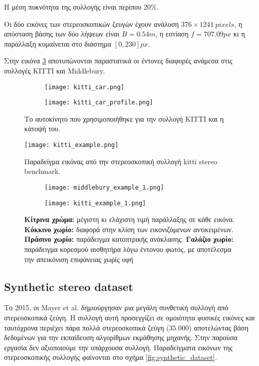 Η μέση πυκνότητα της συλλογής είναι περίπου $20\%$.

Οι δύο εικόνες των στερεοσκοπικών ζευγών έχουν ανάλυση $376\times1241 \: pixels$, η απόσταση βάσης των δύο λήψεων είναι $B=0.54m$, η εστίαση $f=707.09 px$ κι η παράλλαξη κυμαίνεται στο διάστημα $[0,230]px$.

Στην εικόνα \ref{fig:midd_kitti_differences} αποτυπώνονται παραστατικά οι έντονες διαφορές ανάμεσα στις συλλογές \e KITTI \g και \e Middlebury. \g

\begin{figure}
	\centering
	\begin{subfigure}{0.49\textwidth}
		\texttt{[image: kitti\_car.png]}
	\end{subfigure}
	\begin{subfigure}{0.49\textwidth}
		\texttt{[image: kitti\_car\_profile.png]}
	\end{subfigure}
	\caption{Το αυτοκίνητο που χρησιμοποιήθηκε για την συλλογή \e KITTI \g και η κάτοψή του.}
	\label{fig:kitti_car}
\end{figure}

\begin{figure}
	\centering
	\texttt{[image: kitti\_example.png]}
	\caption{Παραδείγμα εικόνας από την στερεοσκοπική συλλογή \e kitti stereo benchmark. \g}
	\label{fig:kitti_example}
\end{figure}

\begin{figure}
	\centering
	\begin{subfigure}{\textwidth}
		\texttt{[image: middlebury\_example\_1.png]}
	\end{subfigure}
	\begin{subfigure}{\textwidth}
		\texttt{[image: kitti\_example\_1.png]}
	\end{subfigure}
	\caption{\textbf{Κίτρινα χρώμα:} μέγιστη κι ελάχιστη τιμή παράλλαξης σε κάθε εικόνα. \textbf{Κόκκινο χωρίο:} διαφορά στην κλίση των εικονιζόμενων αντικειμένων. \textbf{Πράσινο χωρίο:} παράδειγμα κατοπτρικής ανάκλασης. \textbf{Γαλάζιο χωρίο:} παράδειγμα κορεσμού αισθητήρα λόγω έντονου φωτός, με αποτέλεσμα την απεικόνιση επιφάνειας χωρίς υφή}
	\label{fig:midd_kitti_differences}
\end{figure}


\e
\subsection{Synthetic stereo dataset}
\g
Το 2015, οι \e Mayer et al. \cite{mayer2016large} \g δημιούργησαν μια μεγάλη συνθετική συλλογή από στερεοσκοπικά ζεύγη. Η συλλογή αυτή προσεγγίζει σε ομοιότητα φυσικές εικόνες και ταυτόχρονα περιέχει πάρα πολλά στερεοσκοπικά ζεύγη (35.000) αποτελώντας βάση δεδομένων για την εκπαίδευση αλγορίθμων εκμάθησης μηχανής. Στην παρούσα εργασία δεν αξιοποιούμε την υπάρχουσα συλλογή. Παραδείγματα εικόνων της στερεοσκοπικής συλλογής φαίνονται στο σχήμα \ref{fig:synthetic_dataset}.

